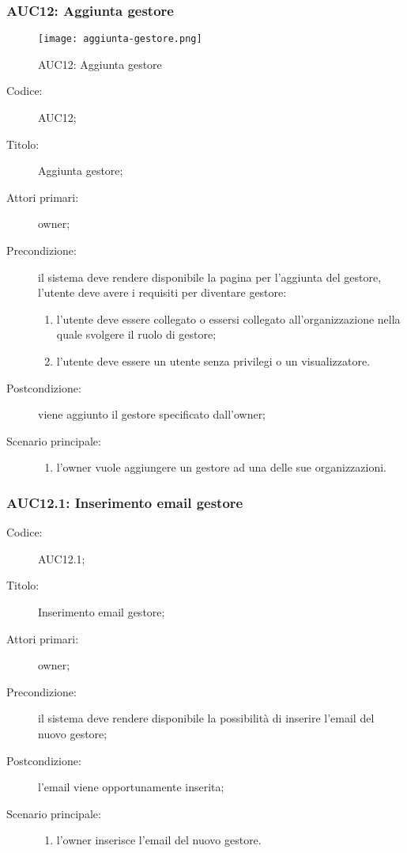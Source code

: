 \documentclass[../../../analisi-dei-requisiti.tex]{subfiles}
\begin{document}
\subsubsection{AUC12: Aggiunta gestore}%
\label{subs:AUC12}

\begin{figure}[H]
  \centering
  \texttt{[image: aggiunta-gestore.png]}
  \caption{AUC12: Aggiunta gestore}%
  \label{fig:AUC12}
\end{figure}

\begin{description}
  \item[Codice:] AUC12;
  \item[Titolo:] Aggiunta gestore;
  \item[Attori primari:] owner;
  \item[Precondizione:] il sistema deve rendere disponibile la pagina per l'aggiunta del gestore, l'utente deve avere i requisiti per diventare gestore:
  \begin{enumerate}
    \item l'utente deve essere collegato o essersi collegato all'organizzazione nella quale svolgere il ruolo di gestore;
    \item l'utente deve essere un utente senza privilegi o un visualizzatore.
  \end{enumerate}
  \item[Postcondizione:] viene aggiunto il gestore specificato dall'owner;
  \item[Scenario principale:]
  \begin{enumerate}
    \item l'owner vuole aggiungere un gestore ad una delle sue organizzazioni.
  \end{enumerate}
\end{description}

\subsubsection{AUC12.1: Inserimento email gestore}%
\label{subs:AUC12.1}
\begin{description}
  \item[Codice:] AUC12.1;
  \item[Titolo:] Inserimento email gestore;
  \item[Attori primari:] owner;
  \item[Precondizione:] il sistema deve rendere disponibile la possibilità di inserire l'email del nuovo gestore;
  \item[Postcondizione:] l'email viene opportunamente inserita;
  \item[Scenario principale:]
  \begin{enumerate}
    \item l'owner inserisce l'email del nuovo gestore.
  \end{enumerate}
\end{description}
\end{document}
